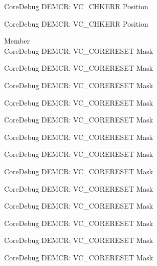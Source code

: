 \begin{DoxyRefList}
\label{deprecated__deprecated001173}%
%
Core\+Debug DEMCR\+: VC\+\_\+\+CHKERR Position 

\label{deprecated__deprecated001275}%
%
Core\+Debug DEMCR\+: VC\+\_\+\+CHKERR Position  
\item[Member \doxylink{group___c_m_s_i_s___core_debug_ga906476e53c1e1487c30f3a1181df9e30}{Core\+Debug\+\_\+\+DEMCR\+\_\+\+VC\+\_\+\+CORERESET\+\_\+\+Msk} ]\hfill \\
\label{deprecated__deprecated000070}%
%
Core\+Debug DEMCR\+: VC\+\_\+\+CORERESET Mask 

\label{deprecated__deprecated000138}%
%
Core\+Debug DEMCR\+: VC\+\_\+\+CORERESET Mask 

\label{deprecated__deprecated000214}%
%
Core\+Debug DEMCR\+: VC\+\_\+\+CORERESET Mask 

\label{deprecated__deprecated000277}%
%
Core\+Debug DEMCR\+: VC\+\_\+\+CORERESET Mask 

\label{deprecated__deprecated000356}%
%
Core\+Debug DEMCR\+: VC\+\_\+\+CORERESET Mask 

\label{deprecated__deprecated000432}%
%
Core\+Debug DEMCR\+: VC\+\_\+\+CORERESET Mask 

\label{deprecated__deprecated000521}%
%
Core\+Debug DEMCR\+: VC\+\_\+\+CORERESET Mask 

\label{deprecated__deprecated000623}%
%
Core\+Debug DEMCR\+: VC\+\_\+\+CORERESET Mask 

\label{deprecated__deprecated000729}%
%
Core\+Debug DEMCR\+: VC\+\_\+\+CORERESET Mask 

\label{deprecated__deprecated000797}%
%
Core\+Debug DEMCR\+: VC\+\_\+\+CORERESET Mask 

\label{deprecated__deprecated000873}%
%
Core\+Debug DEMCR\+: VC\+\_\+\+CORERESET Mask 

\label{deprecated__deprecated000936}%
%
Core\+Debug DEMCR\+: VC\+\_\+\+CORERESET Mask 

\label{deprecated__deprecated001015}%
%
Core\+Debug DEMCR\+: VC\+\_\+\+CORERESET Mask 


\end{DoxyRefList}
